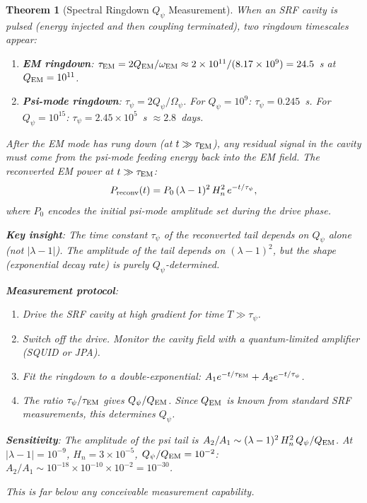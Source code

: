 \documentclass[11pt]{article}
\newcommand{\lam}{\lambda}
\newcommand{\Opsi}{\Omega_\psi}
\newcommand{\ee}[1]{\times 10^{#1}}
\newcommand{\Qpsi}{Q_\psi}
\newcommand{\QEM}{Q_{\rm EM}}
\newcommand{\Heff}{H_n}
\newcommand{\lbone}{|\lam - 1|}
\newtheorem{theorem}{Theorem}[section]
\theoremstyle{definition}
\theoremstyle{remark}
\begin{document}
\begin{theorem}[Spectral Ringdown $\Qpsi$ Measurement]
\label{thm:ringdown}
When an SRF cavity is pulsed (energy injected and then coupling
terminated), two ringdown timescales appear:
\begin{enumerate}[nosep]
\item \textbf{EM ringdown}: $\tau_{\rm EM} = 2\QEM/\omega_{\rm EM}
  \approx 2\times 10^{11}/(8.17\ee{9}) = 24.5$~s at $\QEM = 10^{11}$.
\item \textbf{Psi-mode ringdown}: $\tau_\psi = 2\Qpsi/\Opsi$.
  For $\Qpsi = 10^9$: $\tau_\psi = 0.245$~s.
  For $\Qpsi = 10^{15}$: $\tau_\psi = 2.45\ee{5}$~s $\approx 2.8$~days.
\end{enumerate}

After the EM mode has rung down (at $t \gg \tau_{\rm EM}$), any
residual signal in the cavity must come from the psi-mode feeding
energy back into the EM field. The \emph{reconverted} EM power at
$t \gg \tau_{\rm EM}$:
\begin{equation}
P_{\rm reconv}(t) = P_0\,(\lam-1)^2\,\Heff^2\,e^{-t/\tau_\psi},
\label{eq:P_reconv}
\end{equation}
where $P_0$ encodes the initial psi-mode amplitude set during
the drive phase.

\textbf{Key insight}: The time constant $\tau_\psi$ of the
reconverted tail depends on $\Qpsi$ alone (not $\lbone$). The
\emph{amplitude} of the tail depends on $(\lam-1)^2$, but the
\emph{shape} (exponential decay rate) is purely $\Qpsi$-determined.

\textbf{Measurement protocol}:
\begin{enumerate}[nosep]
\item Drive the SRF cavity at high gradient for time $T \gg \tau_\psi$.
\item Switch off the drive. Monitor the cavity field with a quantum-limited
  amplifier (SQUID or JPA).
\item Fit the ringdown to a double-exponential:
  $A_1 e^{-t/\tau_{\rm EM}} + A_2 e^{-t/\tau_\psi}$.
\item The ratio $\tau_\psi/\tau_{\rm EM}$ gives $\Qpsi/\QEM$.
  Since $\QEM$ is known from standard SRF measurements, this
  determines $\Qpsi$.
\end{enumerate}

\textbf{Sensitivity}: The amplitude of the psi tail is
$A_2/A_1 \sim (\lam-1)^2\,\Heff^2\,\Qpsi/\QEM$. At $\lbone = 10^{-9}$,
$\Heff = 3\ee{-5}$, $\Qpsi/\QEM = 10^{-2}$:
$A_2/A_1 \sim 10^{-18}\times 10^{-10}\times 10^{-2} = 10^{-30}$.

This is far below any conceivable measurement capability.
\end{theorem}
\end{document}
